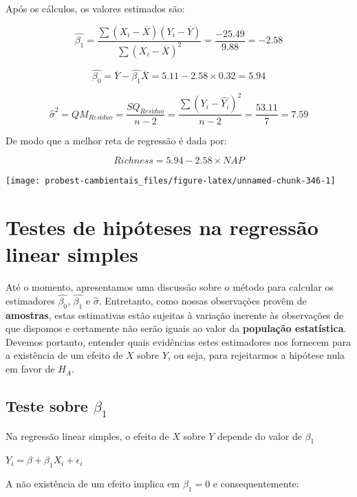 \documentclass[
]{book}
\begin{document}
Após os cálculos, os valores estimados são:

\[\hat{\beta_1} = \frac{\sum{(X_i - \overline{X})(Y_i - \overline{Y})}}{\sum{(X_i - \overline{X})^2}} = \frac{-25.49}{9.88} = -2.58\]

\[\hat{\beta_0} = \overline{Y} - \hat{\beta_1}\overline{X} = 5.11 -2.58 \times 0.32 = 5.94\]

\[\hat{\sigma}^2 = QM_{Resíduo} = \frac{SQ_{Resíduo}}{n-2} = \frac{\sum{(Y_i-\hat{Y_ i})^2}}{n-2} = \frac{53.11}{7} = 7.59\]

De modo que a melhor reta de regressão é dada por:

\[Richness = 5.94 -2.58 \times NAP\]

\begin{center}\texttt{[image: probest-cambientais\_files/figure-latex/unnamed-chunk-346-1]} \end{center}

\hypertarget{testes-de-hipuxf3teses-na-regressuxe3o-linear-simples}{%
\section{Testes de hipóteses na regressão linear simples}\label{testes-de-hipuxf3teses-na-regressuxe3o-linear-simples}}

Até o momento, apresentamos uma discussão sobre o método para calcular os estimadores \(\hat{\beta_0}\), \(\hat{\beta_1}\) e \(\hat{\sigma}\). Entretanto, como nossas observações provêm de \textbf{amostras}, estas estimativas estão sujeitas à variação inerente às observações de que dispomos e certamente não serão iguais ao valor da \textbf{população estatística}. Devemos portanto, entender quais evidências estes estimadores nos fornecem para a existência de um efeito de \(X\) sobre \(Y\), ou seja, para rejeitarmos a hipótese nula em favor de \(H_A\).

\hypertarget{teste-sobre-beta_1}{%
\subsection{\texorpdfstring{Teste sobre \(\beta_1\)}{Teste sobre \textbackslash beta\_1}}\label{teste-sobre-beta_1}}

Na regressão linear simples, o efeito de \(X\) sobre \(Y\) depende do valor de \(\beta_1\)

\(Y_i = \beta + \beta_1X_i + \epsilon_i\)

A não existência de um efeito implica em \(\beta_1 = 0\) e consequentemente:
\end{document}
